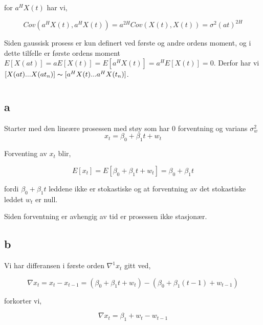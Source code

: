 \documentclass[10pt]{article}
\begin{document}
{for $a^{H}X(t)$ har vi,

\begin{equation}
  Cov(a^{H}X(t),a^{H}X(t)) = a^{2H}Cov(X(t), X(t)) = \sigma^2(at)^{2H}
  \end{equation}

Siden gaussisk prosess er kun definert ved første og andre ordens moment, og i dette tilfelle er første ordens moment $E[X(at)] = aE[X(t)] = E[a^{H}X(t)] = a^{H}E[X(t)] = 0$. Derfor har vi $[X(at)...X(at_{n})]\thicksim[a^{H}X(t)...a^{H}X(t_{n})]$.

\section{}
\subsection{a}

Starter med den lineære prosessen med støy som har 0 forventning og varians $\sigma_{w}^2$
\begin{equation}
  x_{t} = \beta_{0} + \beta_{1}t + w_{t}
\end{equation}


Forventing av $x_{t}$ blir,

\begin{equation*}
  E[x_{t}] = E[\beta_{0} + \beta_{1}t + w_{t}] = \beta_{0} + \beta_{1}t
\end{equation*}

fordi $\beta_{0} + \beta_{1}t$ leddene ikke er stokastiske og at forventning av det stokastiske leddet $w_{t}$ er null.

Siden forventning er avhengig av tid er prosessen ikke stasjonær.

\subsection{b}

Vi har differansen i første orden $\nabla ^1 x_{t}$ gitt ved,

\begin{equation*}
  \nabla x_{t} = x_{t} -  x_{t - 1} = (\beta_{0} + \beta_{1}t + w_{t}) - (\beta_{0} + \beta_{1}(t-1) + w_{t-1})
\end{equation*}

forkorter vi,

\begin{equation*}
  \nabla x_{t} = \beta_{1} + w_{t} - w_{t-1}
\end{equation*}


}
\end{document}
